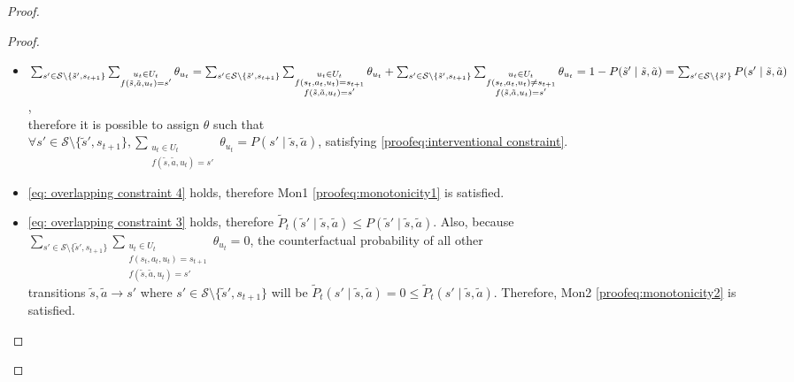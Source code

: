 \begin{proof}
\begin{proof}
\begin{itemize}
    \item $\sum_{s' \in \mathcal{S}\setminus\{\tilde{s}', s_{t+1}\}}\sum_{\substack{u_t \in U_t \\f(\tilde{s}, \tilde{a}, u_t) = s'}} \theta_{u_t} = \sum_{s' \in \mathcal{S}\setminus\{\tilde{s}', s_{t+1}\}}\sum_{\substack{u_t \in U_t \\f(s_t, a_t, u_t) = s_{t+1} \\ f(\tilde{s}, \tilde{a}, u_t) = s'}} \theta_{u_t} \\+ \sum_{s' \in \mathcal{S}\setminus\{\tilde{s}', s_{t+1}\}}\sum_{\substack{u_t \in U_t \\f(s_t, a_t, u_t) \neq s_{t+1} \\ f(\tilde{s}, \tilde{a}, u_t) = s'}} \theta_{u_t} = 1 - P(\tilde{s}' \mid \tilde{s}, \tilde{a}) = \sum_{s' \in \mathcal{S}\setminus\{\tilde{s}'\}}P(s' \mid \tilde{s}, \tilde{a})$, \\therefore it is possible to assign $\theta$ such that \\$\forall s' \in \mathcal{S}\setminus\{\tilde{s}', s_{t+1}\}, \sum_{\substack{u_t \in U_t \\ f(\tilde{s}, \tilde{a}, u_t) = s'}}{\theta_{u_t}} = P(s' \mid \tilde{s}, \tilde{a})$,
    satisfying \eqref{proofeq:interventional constraint}.

    \item \eqref{eq: overlapping constraint 4} holds, therefore Mon1 \eqref{proofeq:monotonicity1} is satisfied.
    
    \item \eqref{eq: overlapping constraint 3} holds, therefore $\tilde{P}_t(\tilde{s}' \mid \tilde{s}, \tilde{a}) \leq P(\tilde{s}' \mid \tilde{s}, \tilde{a})$. Also, because \\$\sum_{s' \in \mathcal{S}\setminus\{\tilde{s}', s_{t+1}\}}\sum_{\substack{u_t \in U_t \\f(s_t, a_t, u_t) = s_{t+1} \\ f(\tilde{s}, \tilde{a}, u_t) = s'}}{\theta_{u_t}} = 0$, the counterfactual probability of all other \\transitions $\tilde{s}, \tilde{a} \rightarrow s'$ where $s' \in \mathcal{S}\setminus\{\tilde{s}', s_{t+1}\}$ will be $\tilde{P}_t(s' \mid \tilde{s}, \tilde{a}) = 0 \leq \tilde{P}_t(s' \mid \tilde{s}, \tilde{a})$. Therefore, Mon2 \eqref{proofeq:monotonicity2} is satisfied.


\end{itemize}
\end{proof}
\end{proof}

